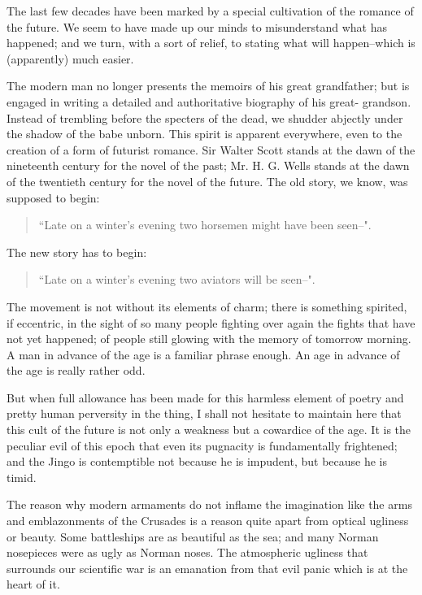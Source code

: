 \documentclass[final,10pt,letterpaper,twocolumn,openany]{book}
\begin{document}
The last few decades have been marked by a special cultivation of the
romance of the future. We seem to have made up our minds to
misunderstand what has happened; and we turn, with a sort of relief, to
stating what will happen--which is (apparently) much easier.

 The modern
man no longer presents the memoirs of his great grandfather; but is
engaged in writing a detailed and authoritative biography of his great-
grandson. Instead of trembling before the specters of the dead, we shudder
abjectly under the shadow of the babe unborn. This spirit is apparent
everywhere, even to the creation of a form of futurist romance. Sir Walter
Scott stands at the dawn of the nineteenth century for the novel of the past;
Mr. H. G. Wells stands at the dawn of the twentieth century for the novel
of the future. The old story, we know, was supposed to begin: 
\begin{quotation}\noindent
	``Late on a
	winter's evening two horsemen might have been seen--".
\end{quotation}
The new story has to begin: 
\begin{quotation}\noindent
	``Late on a winter's evening two aviators will be seen--".
\end{quotation}
The
movement is not without its elements of charm; there is something spirited,
if eccentric, in the sight of so many people fighting over again the fights
that have not yet happened; of people still glowing with the memory of
tomorrow morning. A man in advance of the age is a familiar phrase
enough. An age in advance of the age is really rather odd.

But when full allowance has been made for this harmless element of
poetry and pretty human perversity in the thing, I shall not hesitate to
maintain here that this cult of the future is not only a weakness but a
cowardice of the age. It is the peculiar evil of this epoch that even its
pugnacity is fundamentally frightened; and the Jingo is contemptible not
because he is impudent, but because he is timid.

 The reason why modern
armaments do not inflame the imagination like the arms and
emblazonments of the Crusades is a reason quite apart from optical
ugliness or beauty. Some battleships are as beautiful as the sea; and many
Norman nosepieces were as ugly as Norman noses. The atmospheric
ugliness that surrounds our scientific war is an emanation from that evil
panic which is at the heart of it.
\end{document}
